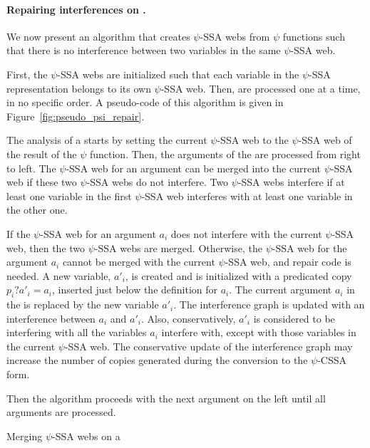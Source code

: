\paragraph{Repairing interferences on \psifuns.}
We now present an algorithm that creates $\psi$-SSA webs from $\psi$
functions such that there is no interference between two variables in
the same $\psi$-SSA web.

First, the $\psi$-SSA webs are initialized such that each variable in
the $\psi$-SSA representation belongs to its own $\psi$-SSA web. Then,
\psifuns are processed one at a time, in no specific order. A
pseudo-code of this algorithm is given in
Figure~\ref{fig:pseudo_psi_repair}.

The analysis of a \psifun starts by setting the current
$\psi$-SSA web to the $\psi$-SSA web of the result of the $\psi$
function. Then, the arguments of the \psifun are processed
from right to left. The $\psi$-SSA web for an argument can be merged
into the current $\psi$-SSA web if these two $\psi$-SSA webs do not
interfere. Two $\psi$-SSA webs interfere if at least one variable in
the first $\psi$-SSA web interferes with at least one variable in the
other one.

If the $\psi$-SSA web for an argument ${a_i}$ does not interfere
with the current $\psi$-SSA web, then the two $\psi$-SSA webs are
merged. Otherwise, the $\psi$-SSA web for the argument ${a_i}$
cannot be merged with the current $\psi$-SSA web, and repair code is
needed. A new variable, ${a'_i}$, is created and is initialized
with a predicated copy ${p_i? a'_i = a_i}$, inserted just below
the definition for ${a_i}$. The current argument ${a_i}$ in
the \psifun is replaced by the new variable ${a'_i}$. The
interference graph is updated with an interference between ${a_i}$
and ${a'_i}$. Also, conservatively, ${a'_i}$ is considered to
be interfering with all the variables ${a_i}$ interfere with,
except with those variables in the current $\psi$-SSA web. The
conservative update of the interference graph may increase the number
of copies generated during the conversion to the $\psi$-CSSA form.

Then the algorithm proceeds with the next argument on the left until
all arguments are processed.

\begin{algorithm}[h]
\caption{Merging $\psi$-SSA webs on a \psifun}
\label{fig:pseudo_psi_repair}
\end{algorithm}


